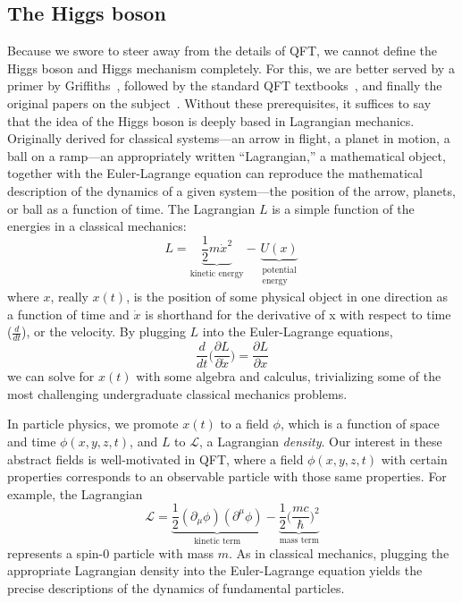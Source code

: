 \subsection{The Higgs boson}\label{sec:higgs}
Because we swore to steer away from the details of QFT, we cannot define the Higgs boson and Higgs mechanism completely. 
For this, we are better served by a primer by Griffiths~\cite{GriffithsParticle}, followed by the standard QFT textbooks~\cite{SrednickiQFT, PeskinSchroederQFT}, and finally the original papers on the subject~\cite{EnglertBroutPRL, HiggsPhysLett, HiggsPRL, GuralnikHagenKibblePRL}. 
Without these prerequisites, it suffices to say that the idea of the Higgs boson is deeply based in Lagrangian mechanics. 
Originally derived for classical systems---an arrow in flight, a planet in motion, a ball on a ramp---an appropriately written ``Lagrangian,'' a mathematical object, together with the Euler-Lagrange equation can reproduce the mathematical description of the dynamics of a given system---the position of the arrow, planets, or ball as a function of time. 
The Lagrangian $L$ is a simple function of the energies in a classical mechanics:
\begin{equation}
    L = \underbrace{\frac{1}{2}m\dot{x}^2}_\text{kinetic energy} - \underbrace{U(x)}_{\substack{\text{potential} \\ \text{energy}}}
\end{equation}
where $x$, really $x(t)$, is the position of some physical object in one direction as a function of time and $\dot{x}$ is shorthand for the derivative of x with respect to time ($\frac{d}{dt}$), or the velocity. 
By plugging $L$ into the Euler-Lagrange equations, 
\begin{equation}
    \frac{d}{dt}\bigg(\frac{\partial L}{\partial\dot{x}}\bigg) = \frac{\partial L}{\partial x}
\end{equation}
we can solve for $x(t)$ with some algebra and calculus, trivializing some of the most challenging undergraduate classical mechanics problems. 

In particle physics, we promote $x(t)$ to a field\footnotemark{} $\phi$, which is a function of space and time $\phi(x, y, z, t)$, and $L$ to $\mathcal{L}$, a Lagrangian \textit{density}.
Our interest in these abstract fields is well-motivated in QFT, where a field $\phi(x,y,z,t)$ with certain properties corresponds to an observable particle with those same properties. 
For example, the Lagrangian 
\begin{equation}
    \mathcal{L} = \underbrace{\frac{1}{2}(\partial_\mu\phi)(\partial^\mu\phi)}_{\text{kinetic term}} - \underbrace{\frac{1}{2}\big(\frac{mc}{\hbar}\big)^2}_\text{mass term}
\end{equation}
represents a spin-0 particle with mass $m$. 
As in classical mechanics, plugging the appropriate Lagrangian density into the Euler-Lagrange equation yields the precise descriptions of the dynamics of fundamental particles. 

